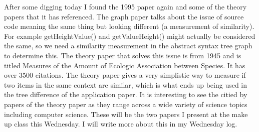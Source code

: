 \documentclass[conference]{IEEEtran}
\begin{document}
After some digging today I found the 1995 paper again and some of the theory
papers that it has referenced. The graph paper talks about the issue of
source code meaning the same thing but looking different (a measurement 
of similarity). For example getHeightValue() and getValueHeight() might 
actually be considered the same, so we need a similarity measurement in the
abstract syntax tree graph to determine this. The theory paper that solves
this issue is from 1945 and is titled Measures of the Amount of Ecologic
Association between Species. It has over 3500 citations. The theory paper
gives a very simplistic way to measure if two items in the same context
are similar, which is what ends up being used in the tree difference of
the application paper. It is interesting to see the citied by papers of
the theory paper as they range across a wide variety of science topics
including computer science. These will be the two papers I present at 
the make up class this Wednesday. I will write more about this in my
Wednesday log.


\balance



\end{document}
